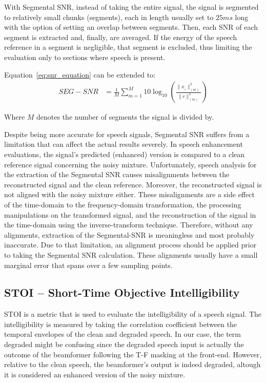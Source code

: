 With Segmental SNR\cite{10.5555/912256}, instead of taking the entire signal,
the signal is segmented to relatively small chunks (segments), 
each in length usually set to \(25ms\) long
with the option of setting an overlap
between segments.
Then, each SNR of each segment is extracted and, finally,
are averaged. 
If the energy of the speech reference 
in a segment is negligible, that segment is excluded,
thus limiting the evaluation only to sections 
where speech is present. 


Equation~\ref{eq:snr_equation} can be extended to:
\begin{align}
    SEG-SNR & = \frac{1}{M}\sum_{m=1}^{M}
                10\log_{10} 
                \left(
                    \frac{ \| x_{_{s}} \|^{2}_{(m)}}{\| r \|^{2}_{(m)}} 
                \right)
\end{align}

Where \(M\) denotes the number of segments the signal is divided by.


Despite being more accurate for speech signals, Segmental SNR 
suffers from a limitation that can affect the actual results severely. 
In speech enhancement evaluations, the signal's predicted (enhanced) version is 
compared to a clean reference signal 
concerning the noisy mixture.
Unfortunately, speech analysis for the extraction of
the Segmental SNR causes misalignments between 
the reconstructed signal and the clean reference. 
Moreover, the reconstructed signal is not aligned 
with the noisy mixture either. 
These misalignments 
are a side effect of the time-domain 
to the frequency-domain transformation, 
the processing manipulations on the transformed signal, 
and the reconstruction of the signal in 
the time-domain using the inverse-transform technique. 
Therefore, without any alignments, extraction of the Segmental-SNR
is meaningless and most probably inaccurate. 
Due to that limitation, an alignment process should be applied
prior to taking the Segmental SNR calculation. These alignments usually 
have a small marginal error that spans over a few sampling points.

\subsection{STOI -- Short-Time Objective Intelligibility}
STOI\cite{5495701} is a metric that is used to evaluate 
the intelligibility of a speech signal.
The intelligibility is measured by taking the correlation
coefficient between the temporal envelopes of the clean
and degraded speech. In our case, the term degraded might
be confusing since the degraded speech input
is actually the outcome of the beamformer
following the T-F masking at the front-end.
However, relative to the clean speech, 
the beamformer's output is indeed degraded, altough
it is considered an enhanced version of the noisy mixture.

